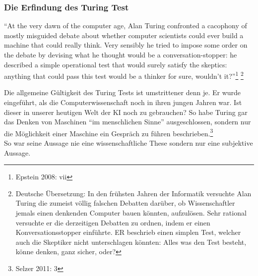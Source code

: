 \documentclass[10pt,a4paper]{article}
\begin{document}
\subsubsection{Die Erfindung des Turing Test}
\begin{displayquote}
\enquote{At the very dawn of the computer age, Alan Turing confronted a cacophony of
mostly misguided debate about whether computer scientists could ever build a
machine that could really think. Very sensibly he tried to impose some order on the
debate by devising what he thought would be a conversation-stopper: he described
a simple operational test that would surely satisfy the skeptics: anything that could
pass this test would be a thinker for sure, wouldn’t it?}\footnote{Epstein 2008: vii} \footnote{Deutsche Übersetzung: In den frühsten Jahren der Informatik versuchte Alan Turing die zumeist völlig falschen Debatten darüber, ob Wissenschaftler jemals einen denkenden Computer bauen könnten, aufzulösen. Sehr rational versuchte er die derzeitigen Debatten zu ordnen, indem er einen Konversationsstopper einführte. ER beschrieb einen simplen Test, welcher auch die Skeptiker nicht unterschlagen könnten: Alles was den Test besteht, könne denken, ganz sicher, oder?}
\end{displayquote}
Die allgemeine Gültigkeit des Turing Tests ist umstrittener denn  je. Er wurde eingeführt, als die Computerwissenschaft noch in ihren jungen Jahren war. Ist dieser in unserer heutigen Welt der KI noch zu gebrauchen? So habe Turing gar das Denken von Maschinen \enquote{im menschlichen Sinne} ausgeschlossen, sondern nur die Möglichkeit einer Maschine ein Gespräch zu führen beschrieben.\footnote{Selzer 2011: 3} \\
So war seine Aussage nie eine wissenschaftliche These sondern nur eine subjektive Aussage.
\end{document}
